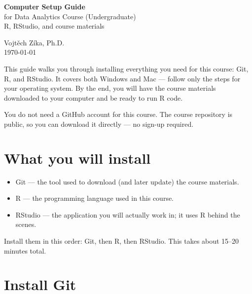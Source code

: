 \documentclass[11pt]{article}
\begin{document}
	
	\begin{titlepage}
		\centering
		\vspace*{2.2in}
		
		{\Huge\bfseries\color{accent} Computer Setup Guide}\\[0.6em]
		{\Large\color{gray!70!black} for Data Analytics Course (Undergraduate)}\\[0.2em]
		{\large\color{gray!60!black} R, RStudio, and course materials}
		
		\vspace{2.5em}
		
		{\large Vojt\v{e}ch Z\'{i}ka, Ph.D.}\\[0.4em]
		{\large \today}
		
		\vfill
	\end{titlepage}
	
	\tableofcontents
	\newpage
	
	This guide walks you through installing everything you need for this course: Git, R, and RStudio. It covers both Windows and Mac --- follow only the steps for your operating system. By the end, you will have the course materials downloaded to your computer and be ready to run R code.
	
	You do not need a GitHub account for this course. The course repository is public, so you can download it directly --- no sign-up required.
	
	\section*{What you will install}
	\begin{itemize}
		\item Git --- the tool used to download (and later update) the course materials.
		\item R --- the programming language used in this course.
		\item RStudio --- the application you will actually work in; it uses R behind the scenes.
	\end{itemize}
	Install them in this order: Git, then R, then RStudio. This takes about 15--20 minutes total.
	

	\section{Install Git}
	
\end{document}
